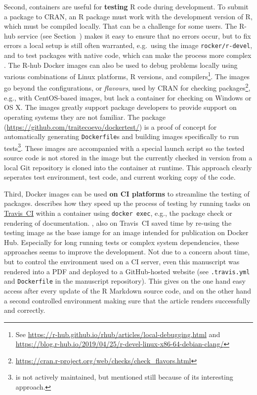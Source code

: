 Second, containers are useful for \textbf{testing} R code during
development. To submit a package to CRAN, an R package must work with
the development version of R, which must be compiled locally. That can
be a challenge for some users. The R-hub service (see
Section~) makes it easy to ensure that no errors occur,
but to fix errors a local setup is still often warranted, e.g.~using the
image \texttt{rocker/r-devel}, and to test packages with native code,
which can make the process more complex
\citep[cf.][]{eckert_building_2018}. The R-hub Docker images can also be
used to debug problems locally using various combinations of Linux
platforms, R versions, and
compilers\footnote{See \href{https://r-hub.github.io/rhub/articles/local-debugging.html}{https://r-hub.github.io/rhub/articles/local-debugging.html} and \href{https://blog.r-hub.io/2019/04/25/r-devel-linux-x86-64-debian-clang/}{https://blog.r-hub.io/2019/04/25/r-devel-linux-x86-64-debian-clang/}}.
The images go beyond the configurations, or \emph{flavours}, used by
CRAN for checking
packages\footnote{\href{https://cran.r-project.org/web/checks/check_flavors.html}{https://cran.r-project.org/web/checks/check\_flavors.html}},
e.g., with CentOS-based images, but lack a container for checking on
Windows or OS X. The images greatly support package developers to
provide support on operating systems they are not familiar. The package
 (\url{https://github.com/traitecoevo/dockertest/}) is a
proof of concept for automatically generating \texttt{Dockerfile}s and
building images specifically to run
tests\footnote{ is not actively maintained, but mentioned still because of its interesting approach.}.
These images are accompanied with a special launch script so the tested
source code is not stored in the image but the currently checked in
version from a local Git repository is cloned into the container at
runtime. This approach clearly seperates test environment, test code,
and current working copy of the code.

Third, Docker images can be used \textbf{on CI platforms} to streamline
the testing of packages. \citet{ye_docker_2019} describes how they speed
up the process of testing by running tasks on
\href{https://travis-ci.org/}{Travis~CI} within a container using
\texttt{docker\ exec}, e.g., the package check or rendering of
documentation. \citet{cardozo_faster_2018}, also on Travis~CI saved time
by re-using the testing image as the base iamge for an image intended
for publication on Docker Hub. Especially for long running tests or
complex system dependencies, these approaches seems to improve the
development. Not due to a concern about time, but to control the
environment used on a CI server, even this manuscript was rendered into
a PDF and deployed to a GitHub-hosted website (see \texttt{.travis.yml}
and \texttt{Dockerfile} in the manuscript repository). This gives on the
one hand easy access after every update of the R Markdown source code,
and on the other hand a second controlled environment making sure that
the article renders successfully and correctly.

